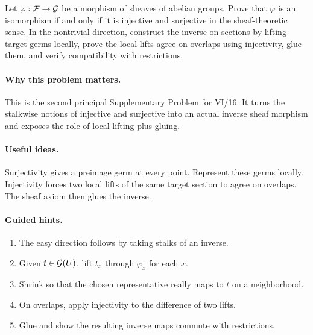 \begin{problem}\label{prob:vi16-p02}
Let $\varphi:\mathcal F\to\mathcal G$ be a morphism of sheaves of abelian groups.  Prove that $\varphi$ is an isomorphism if and only if it is injective and surjective in the sheaf-theoretic sense.  In the nontrivial direction, construct the inverse on sections by lifting target germs locally, prove the local lifts agree on overlaps using injectivity, glue them, and verify compatibility with restrictions.
\end{problem}

\ifdefined\FullProblemDossiers
\paragraph{Why this problem matters.}
This is the second principal Supplementary Problem for VI/16.  It turns the stalkwise notions of injective and surjective into an actual inverse sheaf morphism and exposes the role of local lifting plus gluing.

\paragraph{Useful ideas.}
Surjectivity gives a preimage germ at every point.  Represent these germs locally.  Injectivity forces two local lifts of the same target section to agree on overlaps.  The sheaf axiom then glues the inverse.

\paragraph{Guided hints.}
\begin{enumerate}
\item The easy direction follows by taking stalks of an inverse.
\item Given $t\in\mathcal G(U)$, lift $t_x$ through $\varphi_x$ for each $x$.
\item Shrink so that the chosen representative really maps to $t$ on a neighborhood.
\item On overlaps, apply injectivity to the difference of two lifts.
\item Glue and show the resulting inverse maps commute with restrictions.
\end{enumerate}

